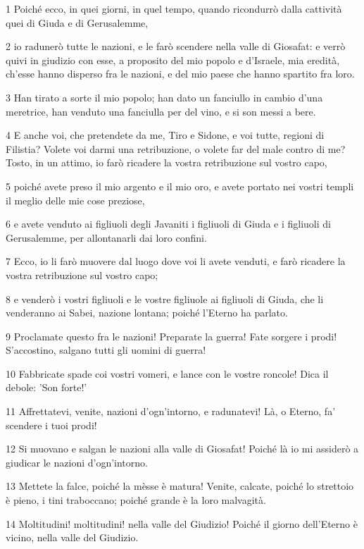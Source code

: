 \par 1 Poiché ecco, in quei giorni, in quel tempo, quando ricondurrò dalla cattività quei di Giuda e di Gerusalemme,
\par 2 io radunerò tutte le nazioni, e le farò scendere nella valle di Giosafat: e verrò quivi in giudizio con esse, a proposito del mio popolo e d'Israele, mia eredità, ch'esse hanno disperso fra le nazioni, e del mio paese che hanno spartito fra loro.
\par 3 Han tirato a sorte il mio popolo; han dato un fanciullo in cambio d'una meretrice, han venduto una fanciulla per del vino, e si son messi a bere.
\par 4 E anche voi, che pretendete da me, Tiro e Sidone, e voi tutte, regioni di Filistia? Volete voi darmi una retribuzione, o volete far del male contro di me? Tosto, in un attimo, io farò ricadere la vostra retribuzione sul vostro capo,
\par 5 poiché avete preso il mio argento e il mio oro, e avete portato nei vostri templi il meglio delle mie cose preziose,
\par 6 e avete venduto ai figliuoli degli Javaniti i figliuoli di Giuda e i figliuoli di Gerusalemme, per allontanarli dai loro confini.
\par 7 Ecco, io li farò muovere dal luogo dove voi li avete venduti, e farò ricadere la vostra retribuzione sul vostro capo;
\par 8 e venderò i vostri figliuoli e le vostre figliuole ai figliuoli di Giuda, che li venderanno ai Sabei, nazione lontana; poiché l'Eterno ha parlato.
\par 9 Proclamate questo fra le nazioni! Preparate la guerra! Fate sorgere i prodi! S'accostino, salgano tutti gli uomini di guerra!
\par 10 Fabbricate spade coi vostri vomeri, e lance con le vostre roncole! Dica il debole: 'Son forte!'
\par 11 Affrettatevi, venite, nazioni d'ogn'intorno, e radunatevi! Là, o Eterno, fa' scendere i tuoi prodi!
\par 12 Si muovano e salgan le nazioni alla valle di Giosafat! Poiché là io mi assiderò a giudicar le nazioni d'ogn'intorno.
\par 13 Mettete la falce, poiché la mèsse è matura! Venite, calcate, poiché lo strettoio è pieno, i tini traboccano; poiché grande è la loro malvagità.
\par 14 Moltitudini! moltitudini! nella valle del Giudizio! Poiché il giorno dell'Eterno è vicino, nella valle del Giudizio.
